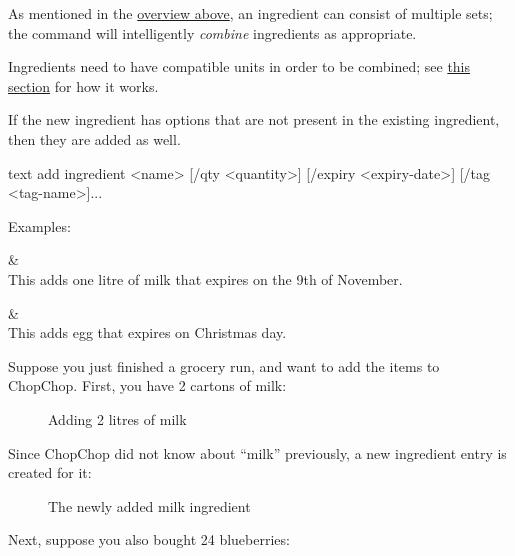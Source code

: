 	As mentioned in the \hyperlink{OverviewIngredients}{overview above}, an ingredient can consist of multiple sets;
	the  command will intelligently \emph{combine} ingredients as appropriate.

	\begin{infobox}
		\info{}\hspace{.6em}\parbox{0.9\textwidth}{%
			 Ingredients need to have compatible units in order to be combined;
			see \hyperlink{QuantitiesAndUnits}{this section} for how it works.
		}
	\end{infobox}

	If the new ingredient has  options that are not present in the existing ingredient, then they are added as well.

	 \begin{blockofcode}{text}
		add ingredient <name>
			[/qty <quantity>]
			[/expiry <expiry-date>]
			[/tag <tag-name>]...
	\end{blockofcode}

	Examples:
	\begin{bulletlist}
		&  \\
		  This adds one litre of milk that expires on the 9th of November.

		&  \\
		  This adds  egg that expires on Christmas day.
	\end{bulletlist}

	\pagebreak
	Suppose you just finished a grocery run, and want to add the items to ChopChop. First, you have 2 cartons of milk:
	\vspace{-.5em} %

	\begin{figure}[!htbp]\centering\ContinuedFloat*
		\caption{Adding 2 litres of milk}
	\end{figure}
	\vspace{-1.5em} %
	Since ChopChop did not know about \enquote{milk} previously, a new ingredient entry is created for it:

	\begin{figure}[!htbp]\centering\ContinuedFloat
		\caption{The newly added milk ingredient}
	\end{figure}

	\pagebreak
	Next, suppose you also bought 24 blueberries:

